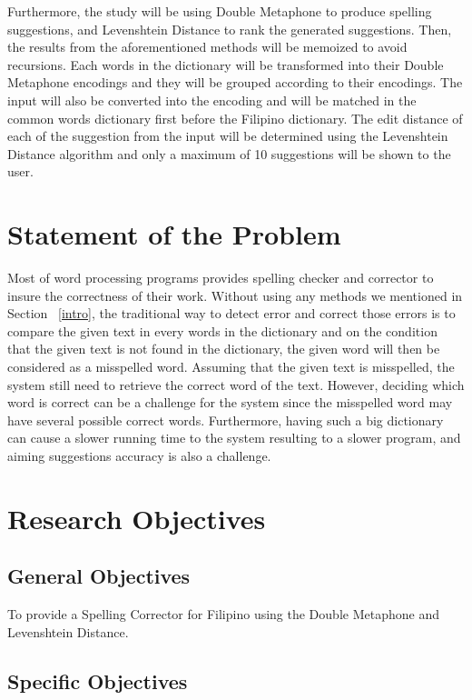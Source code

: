 \documentclass[12pt]{book}
\begin{document}
Furthermore, the study will be using Double Metaphone to produce spelling suggestions, and Levenshtein Distance to rank the generated suggestions. Then, the results from the aforementioned methods will be memoized to avoid recursions. Each words in the dictionary will be transformed into their Double Metaphone encodings and they will be grouped according to their encodings. The input will also be converted into the encoding and will be matched in the common words dictionary first before the Filipino dictionary. The edit distance of each of the suggestion from the input will be determined using the Levenshtein Distance algorithm and only a maximum of 10 suggestions will be shown to the user.

\section{Statement of the Problem}
Most of word processing programs provides spelling checker and corrector to insure the correctness of their work. Without using any methods we mentioned in Section ~\ref{intro}, the traditional way to detect error and correct those errors is to compare the given text in every words in the dictionary and on the condition that the given text is not found in the dictionary, the given word will then be considered as a misspelled word. Assuming that the given text is misspelled, the system still need to retrieve the correct word of the text. However, deciding which word is correct can be a challenge for the system since the misspelled word may have several possible correct words. Furthermore, having such a big dictionary can cause a slower running time to the system resulting to a slower program, and aiming suggestions accuracy is also a challenge. 

\section{Research Objectives}
\subsection{General Objectives}
To provide a Spelling Corrector for Filipino using the Double Metaphone and Levenshtein Distance.
\subsection{Specific Objectives}
\end{document}

